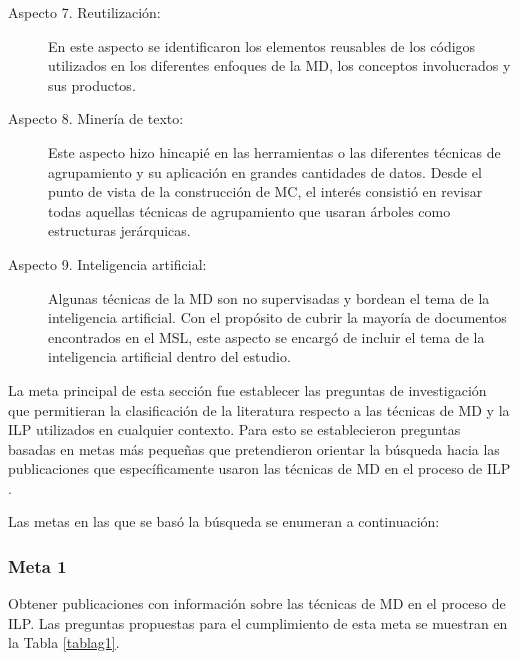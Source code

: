 \begin{description}
\item[Aspecto 7. Reutilización:] En este aspecto se identificaron los elementos reusables de los códigos utilizados en los diferentes enfoques de la MD, los conceptos involucrados y sus productos.

\item[Aspecto 8. Minería de texto:]  Este aspecto hizo hincapié en las herramientas o las diferentes técnicas de agrupamiento y su aplicación en grandes cantidades de datos. Desde el punto de vista de la construcción de MC, el interés consistió en revisar todas aquellas técnicas de agrupamiento que usaran árboles como estructuras jerárquicas.


\item[Aspecto 9. Inteligencia artificial:] Algunas técnicas de la MD son no supervisadas y bordean el tema de la inteligencia artificial. Con el propósito de cubrir la mayoría de documentos encontrados en el MSL, este aspecto se encargó de incluir el tema de la inteligencia artificial dentro del estudio.
\end{description}



La meta principal de esta sección fue establecer las preguntas de investigación que permitieran la clasificación de la literatura respecto a las técnicas de MD y la ILP utilizados en cualquier contexto. 
Para esto se establecieron preguntas basadas en metas más pequeñas que pretendieron orientar la búsqueda hacia las publicaciones que específicamente  usaron las técnicas de MD en el proceso de ILP .

Las metas en las que se basó la búsqueda se enumeran a continuación:

\subsubsection{Meta 1}
Obtener publicaciones con información sobre las técnicas de MD en el proceso de ILP. Las preguntas propuestas para el cumplimiento de esta meta se muestran en la Tabla \ref{tablag1}.

